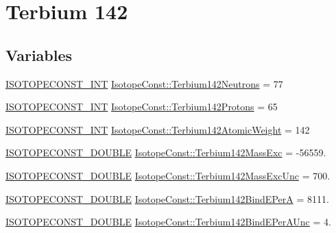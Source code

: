 \hypertarget{group___isotope_const-_terbium-_tb142}{}\section{Terbium 142}
\label{group___isotope_const-_terbium-_tb142}
\subsection*{Variables}
\begin{DoxyCompactItemize}
\item 
\mbox{\hyperlink{group___isotope_const-_macros_ga5f18360b3e99483a35c32d789e62621c}{I\+S\+O\+T\+O\+P\+E\+C\+O\+N\+S\+T\+\_\+\+I\+NT}} \mbox{\hyperlink{group___isotope_const-_terbium-_tb142_ga0d1bce83e13d46d550ef3e7b1a355ac8}{Isotope\+Const\+::\+Terbium142\+Neutrons}} = 77
\item 
\mbox{\hyperlink{group___isotope_const-_macros_ga5f18360b3e99483a35c32d789e62621c}{I\+S\+O\+T\+O\+P\+E\+C\+O\+N\+S\+T\+\_\+\+I\+NT}} \mbox{\hyperlink{group___isotope_const-_terbium-_tb142_ga70bcaf3bebbd2ce8ed2fe41ffc2b869e}{Isotope\+Const\+::\+Terbium142\+Protons}} = 65
\item 
\mbox{\hyperlink{group___isotope_const-_macros_ga5f18360b3e99483a35c32d789e62621c}{I\+S\+O\+T\+O\+P\+E\+C\+O\+N\+S\+T\+\_\+\+I\+NT}} \mbox{\hyperlink{group___isotope_const-_terbium-_tb142_gabc67dc486d8a7008443f9c5227557cab}{Isotope\+Const\+::\+Terbium142\+Atomic\+Weight}} = 142
\item 
\mbox{\hyperlink{group___isotope_const-_macros_ga8f45a7272ce02c0b4c65c44636ed719a}{I\+S\+O\+T\+O\+P\+E\+C\+O\+N\+S\+T\+\_\+\+D\+O\+U\+B\+LE}} \mbox{\hyperlink{group___isotope_const-_terbium-_tb142_ga7ca09b28a7167e263b605127b7a086c4}{Isotope\+Const\+::\+Terbium142\+Mass\+Exc}} = -\/56559.
\item 
\mbox{\hyperlink{group___isotope_const-_macros_ga8f45a7272ce02c0b4c65c44636ed719a}{I\+S\+O\+T\+O\+P\+E\+C\+O\+N\+S\+T\+\_\+\+D\+O\+U\+B\+LE}} \mbox{\hyperlink{group___isotope_const-_terbium-_tb142_ga5e6a4b9bf2434bb30aeb3884fbc3677a}{Isotope\+Const\+::\+Terbium142\+Mass\+Exc\+Unc}} = 700.
\item 
\mbox{\hyperlink{group___isotope_const-_macros_ga8f45a7272ce02c0b4c65c44636ed719a}{I\+S\+O\+T\+O\+P\+E\+C\+O\+N\+S\+T\+\_\+\+D\+O\+U\+B\+LE}} \mbox{\hyperlink{group___isotope_const-_terbium-_tb142_ga36fc6afe0d7f34ff8983c38190b695bf}{Isotope\+Const\+::\+Terbium142\+Bind\+E\+PerA}} = 8111.
\item 
\mbox{\hyperlink{group___isotope_const-_macros_ga8f45a7272ce02c0b4c65c44636ed719a}{I\+S\+O\+T\+O\+P\+E\+C\+O\+N\+S\+T\+\_\+\+D\+O\+U\+B\+LE}} \mbox{\hyperlink{group___isotope_const-_terbium-_tb142_ga3665f199c2979a43a1675c5763b67e90}{Isotope\+Const\+::\+Terbium142\+Bind\+E\+Per\+A\+Unc}} = 4.

\end{DoxyCompactItemize}
